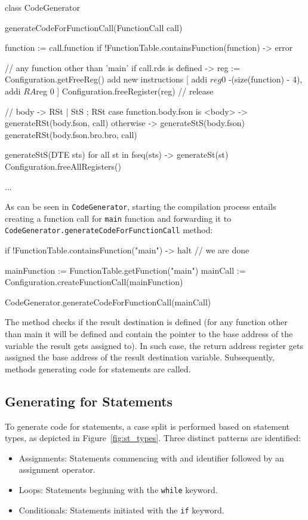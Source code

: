 \begin{codeblock}
class CodeGenerator {
    generateCodeForFunctionCall(FunctionCall call) {
        function := call.function
        if !FunctionTable.containsFunction(function) -> { error }

        // any function other than 'main'
        if call.rds is defined -> {
            reg := Configuration.getFreeReg()
            add new instructions [
                addi $reg $0 -(size(function) - 4),
                addi $RA $reg 0
            ]
            Configuration.freeRegister(reg) // release
        }

        // body -> RSt | StS ; RSt
        case function.body.fson is <body> -> generateRSt(body.fson, call)
        otherwise -> {
            generateStS(body.fson)
            generateRSt(body.fson.bro.bro, call)
        }
    }

    generateStS(DTE sts) {
        for all st in fseq(sts) -> {
            generateSt(st)
            Configuration.freeAllRegisters()
        }
    }

    ...
}
\end{codeblock}
As can be seen in \verb+CodeGenerator+, starting the compilation process entails creating a function call for
\verb+main+ function and forwarding it to \verb+CodeGenerator.generateCodeForFunctionCall+ method:
\begin{codeblock}
if !FunctionTable.containsFunction("main") -> { halt } // we are done

mainFunction := FunctionTable.getFunction("main")
mainCall := Configuration.createFunctionCall(mainFunction)

CodeGenerator.generateCodeForFunctionCall(mainCall)
\end{codeblock}
The method checks if the result destination is defined (for any function other than main it will be defined
and contain the pointer to the base address of the variable the result gets assigned to). In such case, the return address
register gets assigned the base address of the result destination variable. Subsequently, methods generating code for
statements are called.

\subsection{Generating for Statements}
To generate code for statements, a case split is performed based on statement types, as depicted in Figure~\ref{fig:st_types}.
Three distinct patterns are identified:
\begin{itemize}
    \item Assignments: Statements commencing with and identifier followed by an assignment operator.
    \item Loops: Statements beginning with the \verb+while+ keyword.
    \item Conditionals: Statements initiated with the \verb+if+ keyword.
\end{itemize}

